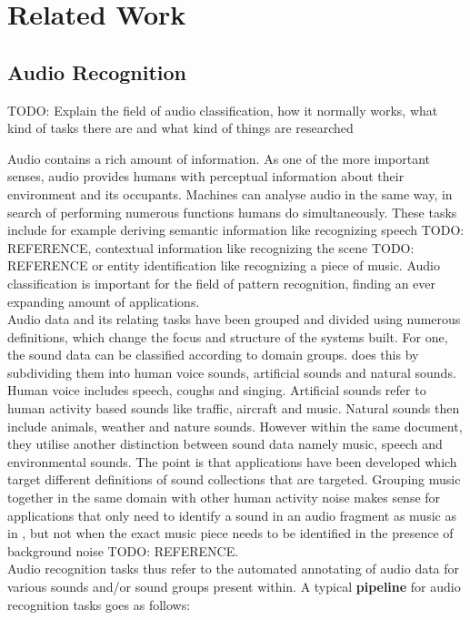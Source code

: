 \chapter{Related Work}

\section{Audio Recognition}
TODO: Explain the field of audio classification, how it normally works, what kind of tasks there are and what kind of things are researched

Audio contains a rich amount of information. As one of the more important senses, audio provides humans with perceptual information about their environment and its occupants. Machines can analyse audio in the same way, in search of performing numerous functions humans do simultaneously. These tasks include for example deriving semantic information like recognizing speech TODO: REFERENCE, contextual information like recognizing the scene TODO: REFERENCE or entity identification like recognizing a piece of music. Audio classification is important for the field of pattern recognition, finding an ever expanding amount of applications. \\

Audio data and its relating tasks have been grouped and divided using numerous definitions, which change the focus and structure of the systems built. For one, the sound data can be classified according to domain groups. \cite{duan2014survey} does this by subdividing them into human voice sounds, artificial sounds and natural sounds. Human voice includes speech, coughs and singing. Artificial sounds refer to human activity based sounds like traffic, aircraft and music. Natural sounds then include animals, weather and nature sounds. However within the same document, they utilise another distinction between sound data namely music, speech and environmental sounds. The point is that applications have been developed which target different definitions of sound collections that are targeted. Grouping music together in the same domain with other human activity noise makes sense for applications that only need to identify a sound in an audio fragment as music as in \cite{park2020augmenting}, but not when the exact music piece needs to be identified in the presence of background noise TODO: REFERENCE.\\

Audio recognition tasks thus refer to the automated annotating of audio data for various sounds and/or sound groups present within. A typical \textbf{pipeline} for audio recognition tasks goes as follows: \\

